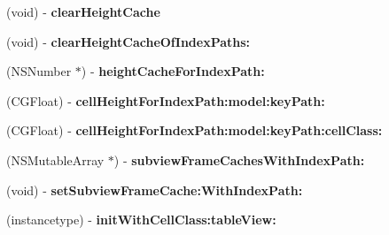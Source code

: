 \begin{DoxyCompactItemize}
\item 
\mbox{\label{interface_s_d_cell_auto_height_manager_ad6f9456c8b545b930a15bc7082ad20e4}} 
(void) -\/ {\bfseries clear\+Height\+Cache}
\item 
\mbox{\label{interface_s_d_cell_auto_height_manager_adf4ca610ef22e747bb2df1a9f235aa14}} 
(void) -\/ {\bfseries clear\+Height\+Cache\+Of\+Index\+Paths\+:}
\item 
\mbox{\label{interface_s_d_cell_auto_height_manager_a4070468f90f41067d6738a1be234dfe7}} 
(N\+S\+Number $\ast$) -\/ {\bfseries height\+Cache\+For\+Index\+Path\+:}
\item 
\mbox{\label{interface_s_d_cell_auto_height_manager_a2a5896ec493fc5df80c9e1ff592c21c7}} 
(C\+G\+Float) -\/ {\bfseries cell\+Height\+For\+Index\+Path\+:model\+:key\+Path\+:}
\item 
\mbox{\label{interface_s_d_cell_auto_height_manager_af9c607476f787a5481ca8b36114347fd}} 
(C\+G\+Float) -\/ {\bfseries cell\+Height\+For\+Index\+Path\+:model\+:key\+Path\+:cell\+Class\+:}
\item 
\mbox{\label{interface_s_d_cell_auto_height_manager_a4f8cba36a583c453a5df1f7807403ea4}} 
(N\+S\+Mutable\+Array $\ast$) -\/ {\bfseries subview\+Frame\+Caches\+With\+Index\+Path\+:}
\item 
\mbox{\label{interface_s_d_cell_auto_height_manager_ab7d9fba723cd6ad3d9546d06406aacbc}} 
(void) -\/ {\bfseries set\+Subview\+Frame\+Cache\+:\+With\+Index\+Path\+:}
\item 
\mbox{\label{interface_s_d_cell_auto_height_manager_ac52143331c0c4acae103205e07a52b29}} 
(instancetype) -\/ {\bfseries init\+With\+Cell\+Class\+:table\+View\+:}
\item 
\mbox{\label{interface_s_d_cell_auto_height_manager_ad6f9456c8b545b930a15bc7082ad20e4}} 

\end{DoxyCompactItemize}
